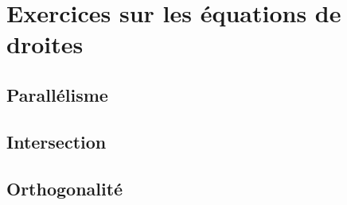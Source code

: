 
\section{Exercices sur les équations de droites}


\subsection{Parallélisme}


\subsection{Intersection}


\subsection{Orthogonalité}

